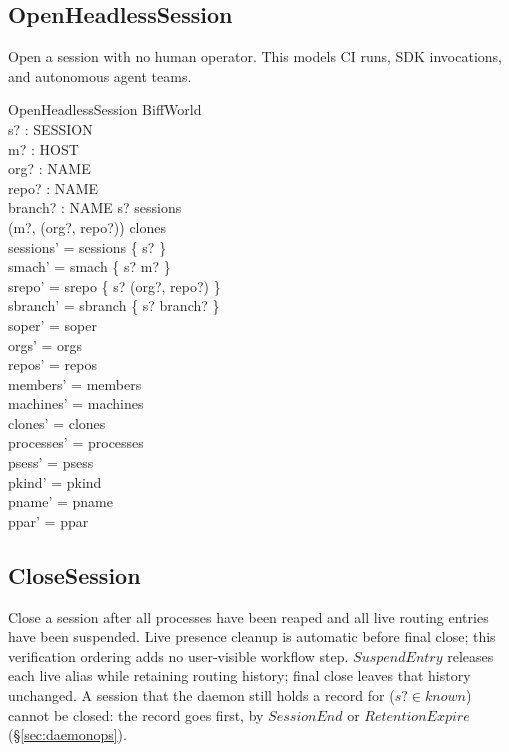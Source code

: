 \documentclass[a4paper,10pt,fleqn]{article}
\begin{document}
\subsection{OpenHeadlessSession}

Open a session with no human operator.  This models CI runs, SDK
invocations, and autonomous agent teams.

\begin{schema}{OpenHeadlessSession}
  \Delta BiffWorld \\
  s? : SESSION \\
  m? : HOST \\
  org? : NAME \\
  repo? : NAME \\
  branch? : NAME
  \where
  s? \notin sessions \\
  (m?, (org?, repo?)) \in clones \\
  sessions' = sessions \cup \{ s? \} \\
  smach' = smach \cup \{ s? \mapsto m? \} \\
  srepo' = srepo \cup \{ s? \mapsto (org?, repo?) \} \\
  sbranch' = sbranch \cup \{ s? \mapsto branch? \} \\
  soper' = soper \\
  orgs' = orgs \\
  repos' = repos \\
  members' = members \\
  machines' = machines \\
  clones' = clones \\
  processes' = processes \\
  psess' = psess \\
  pkind' = pkind \\
  pname' = pname \\
  ppar' = ppar
\end{schema}

\subsection{CloseSession}

Close a session after all processes have been reaped and all live routing
entries have been suspended.  Live presence cleanup is automatic before
final close; this verification ordering adds no user-visible workflow
step.  $SuspendEntry$ releases each live alias while retaining routing
history; final close leaves that history unchanged.  A session that the
daemon still holds a record for ($s? \in known$) cannot be closed: the
record goes first, by $SessionEnd$ or $RetentionExpire$
(\S\ref{sec:daemonops}).
\end{document}
